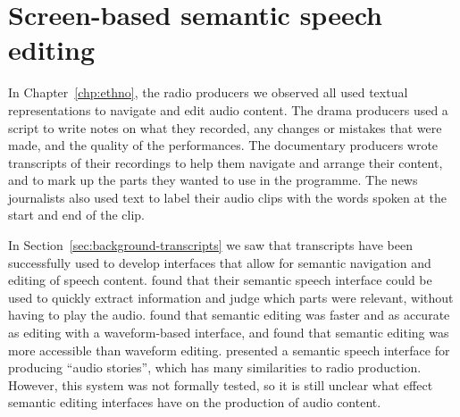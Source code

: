 \chapter{Screen-based semantic speech editing}\label{chp:screen}

In Chapter~\ref{chp:ethno}, the radio producers we observed all used textual representations to navigate and edit audio
content. The drama producers used a script to write notes on what they recorded, any changes or mistakes that were made, and the
quality of the performances. The documentary producers wrote transcripts of their recordings to help them navigate and
arrange their content, and to mark up the parts they wanted to use in the programme. The news journalists also used
text to label their audio clips with the words spoken at the start and end of the clip.

In Section~\ref{sec:background-transcripts} we saw that transcripts have been successfully used to develop interfaces
that allow for semantic navigation and editing of speech content.  \citet{Whittaker2002} found that their semantic
speech interface could be used to quickly extract information and judge which parts were relevant, without having to
play the audio.  \citet{Whittaker2004} found that semantic editing was faster and as accurate as editing with a
waveform-based interface, and \citet{Sivaraman2016} found that semantic editing was more accessible than waveform
editing.  \citet{Rubin2013} presented a semantic speech interface for producing ``audio stories'', which has many
similarities to radio production. However, this system was not formally tested, so it is still unclear what effect
semantic editing interfaces have on the production of audio content.

